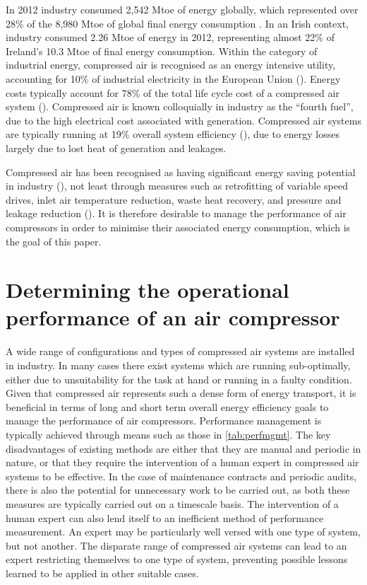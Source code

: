 In 2012 industry consumed 2,542 Mtoe of energy globally, which represented  over 28\% of the 8,980 Mtoe of global final energy consumption \cite{IEA2012}. In an Irish context, industry consumed 2.26 Mtoe of energy in 2012, representing almost 22\% of Ireland’s 10.3 Mtoe of final energy consumption. Within the category of industrial energy, compressed air is recognised as an energy intensive utility, accounting for 10\% of industrial electricity in the European Union (\cite{Saidur2010}). Energy costs typically account for 78\% of the total life cycle cost of a compressed air system (\cite{radgen2006efficiency}). Compressed air is known colloquially in industry as the “fourth fuel”, due to the high electrical cost associated with generation. Compressed air systems are typically running at 19\% overall system efficiency (\cite{Saidur2010}), due to energy losses largely due to lost heat of generation and leakages.

Compressed air has been recognised as having significant energy saving potential in industry (\cite{Wang2014}), not least through measures such as retrofitting of variable speed drives, inlet air temperature reduction, waste heat recovery, and pressure and leakage reduction (\cite{Wang2008}). It is therefore desirable to manage the performance of air compressors in order to minimise their associated energy consumption, which is the goal of this paper. 

\section{Determining the operational performance of an air compressor}
\label{sec:probstatement}
A wide range of configurations and types of compressed air systems are installed in industry. In many cases there exist systems which are running sub-optimally, either due to unsuitability for the task at hand or running in a faulty condition. Given that compressed air represents such a dense form of energy transport, it is beneficial in terms of long and short term overall energy efficiency goals to manage the performance of air compressors. Performance management is typically achieved through means such as those in  \autoref{tab:perfmgmt}. The key disadvantages of existing methods are either that they are manual and periodic in nature, or that they require the intervention of a human expert in compressed air systems to be effective. In the case of maintenance contracts and periodic audits, there is also the potential for unnecessary work to be carried out, as both these measures are typically carried out on a timescale basis. The intervention of a human expert can also lend itself to an inefficient method of performance measurement. An expert may be particularly well versed with one type of system, but not another. The disparate range of compressed air systems can lead to an expert restricting themselves to one type of system, preventing possible lessons learned to be applied in other suitable cases.

